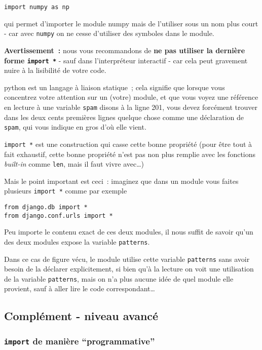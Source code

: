 \begin{verbatim}
import numpy as np
\end{verbatim}

qui permet d'importer le module numpy mais de l'utiliser sous un nom
plus court - car avec \texttt{numpy} on ne cesse d'utiliser des symboles
dans le module.

    \textbf{Avertissement~:} nous vous recommandons de \textbf{ne pas
utiliser la dernière forme \texttt{import\ *}} - sauf dans
l'interpréteur interactif - car cela peut gravement nuire à la
lisibilité de votre code.

    python est un langage à liaison statique~; cela signifie que lorsque
vous concentrez votre attention sur un (votre) module, et que vous voyez
une référence en lecture à une variable \texttt{spam} disons à la ligne
201, vous devez forcément trouver dans les deux cents premières lignes
quelque chose comme une déclaration de \texttt{spam}, qui vous indique
en gros d'où elle vient.

\texttt{import\ *} est une construction qui casse cette bonne propriété
(pour être tout à fait exhaustif, cette bonne propriété n'est pas non
plus remplie avec les fonctions \emph{built-in} comme \texttt{len}, mais
il faut vivre avec\ldots{})

Mais le point important est ceci~: imaginez que dans un module vous
faites plusieurs \texttt{import\ *} comme par exemple

\begin{verbatim}
from django.db import *
from django.conf.urls import *
\end{verbatim}

Peu importe le contenu exact de ces deux modules, il nous suffit de
savoir qu'un des deux modules expose la variable \texttt{patterns}.

Dans ce cas de figure vécu, le module utilise cette variable
\texttt{patterns} sans avoir besoin de la déclarer explicitement, si
bien qu'à la lecture on voit une utilisation de la variable
\texttt{patterns}, mais on n'a plus aucune idée de quel module elle
provient, sauf à aller lire le code correspondant\ldots{}

    \hypertarget{compluxe9ment---niveau-avancuxe9}{%
\subsection{Complément - niveau
avancé}\label{compluxe9ment---niveau-avancuxe9}}

    \hypertarget{import-de-maniuxe8re-programmative}{%
\subsubsection{\texorpdfstring{\texttt{import} de manière
``programmative''}{import de manière ``programmative''}}\label{import-de-maniuxe8re-programmative}}

